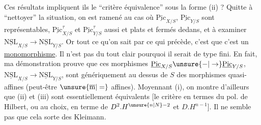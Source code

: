Ces résultats impliquent ils le ``critère  équivalence'' sous la forme (ii) ? Quitte à ``nettoyer'' la situation, on est ramené au cas où $\underline{\mathrm{Pic}}_{X/S}$, $\underline{\mathrm{Pic}}_{Y/S}$ sont représentables, $\underline{\mathrm{Pic}}^\tau_{X/S}$ et $\underline{\mathrm{Pic}}^\tau_{Y/S}$ aussi et plats et fermés dedans, et à examiner $\underline{\mathrm{NSL}}_{X/S}\to\underline{\mathrm{NSL}}_{Y/S}$. Or tout ce qu'on sait par ce qui précède, c'est que c'est un \uline{monomorphisme}. Il n'est pas du tout clair pourquoi il serait de type fini. En fait, ma démonstration prouve que ces morphismes $\underline{\mathrm{Pic}}_{X/S}\unsure{-|\to}\underline{\mathrm{Pic}}_{Y/S}$, $\underline{\mathrm{NSL}}_{X/S}\to\underline{\mathrm{NSL}}_{Y/S}$, sont génériquement au dessus de $S$ des morphismes quasi-affines (peut-être $\unsure{\overline{\mathrm{m}}|=}$ affines). Moyennant (i), on montre d'ailleurs que (ii) et (iii) sont essentiellement équivalents [le critère en termes du pol. de Hilbert, ou au choix, en terme de $D^2.H^{\unsure{n|N}-2}$ et $D.H^{n-1}$]. Il ne semble pas que cela sorte des  Kleimann.

